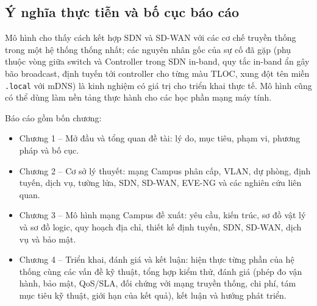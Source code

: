 \subsection{Ý nghĩa thực tiễn và bố cục báo cáo}

Mô hình cho thấy cách kết hợp SDN và SD-WAN với các cơ chế truyền thống trong một hệ thống thống nhất; các nguyên nhân gốc của sự cố đã gặp (phụ thuộc vòng giữa switch và Controller trong SDN in-band, quy tắc in-band ẩn gây bão broadcast, định tuyến tới controller cho từng màu TLOC, xung đột tên miền \texttt{.local} với mDNS) là kinh nghiệm có giá trị cho triển khai thực tế. Mô hình cũng có thể dùng làm nền tảng thực hành cho các học phần mạng máy tính.

Báo cáo gồm bốn chương:
\begin{itemize}
    \item Chương 1 -- Mở đầu và tổng quan đề tài: lý do, mục tiêu, phạm vi, phương pháp và bố cục.
    \item Chương 2 -- Cơ sở lý thuyết: mạng Campus phân cấp, VLAN, dự phòng, định tuyến, dịch vụ, tường lửa, SDN, SD-WAN, EVE-NG và các nghiên cứu liên quan.
    \item Chương 3 -- Mô hình mạng Campus đề xuất: yêu cầu, kiến trúc, sơ đồ vật lý và sơ đồ logic, quy hoạch địa chỉ, thiết kế định tuyến, SDN, SD-WAN, dịch vụ và bảo mật.
    \item Chương 4 -- Triển khai, đánh giá và kết luận: hiện thực từng phần của hệ thống cùng các vấn đề kỹ thuật, tổng hợp kiểm thử, đánh giá (phép đo vận hành, bảo mật, QoS/SLA, đối chứng với mạng truyền thống, chi phí, tám mục tiêu kỹ thuật, giới hạn của kết quả), kết luận và hướng phát triển.
\end{itemize}
